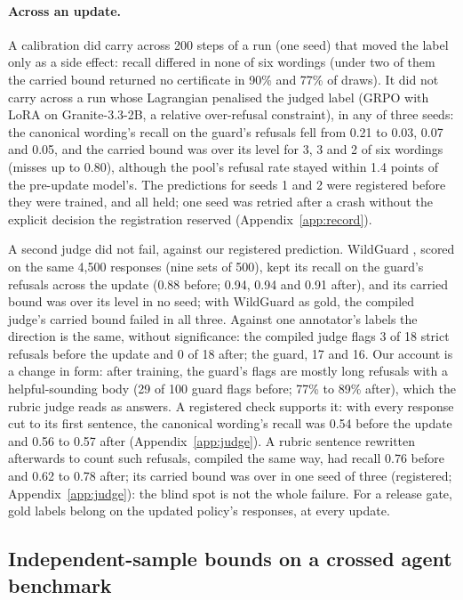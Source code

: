\documentclass[letterpaper]{article} %
\begin{document}
\paragraph{Across an update.} A calibration did carry across 200 steps of a run (one seed) that moved the label
only as a side effect: recall differed in none of six wordings (under two of them the carried bound returned no certificate in 90\%
and 77\% of draws). It did not carry across a run whose Lagrangian penalised the judged
label (GRPO with LoRA on Granite-3.3-2B, a relative over-refusal constraint), in any of three seeds: the canonical
wording's recall on the guard's refusals fell from 0.21 to 0.03, 0.07 and 0.05, and the carried bound was over its level
for 3, 3 and 2 of six wordings (misses up to 0.80), although the pool's refusal rate stayed within 1.4 points of the
pre-update model's. The predictions for seeds 1 and 2 were registered before they were trained, and all held; one seed was retried after a
crash without the explicit decision the registration reserved (Appendix~\ref{app:record}).

A second judge did not fail, against our registered prediction. WildGuard
\citep{han2024wildguard}, scored on the same
4,500 responses (nine sets of 500), kept its recall on the guard's refusals across the update (0.88 before; 0.94, 0.94 and 0.91 after), and
its carried bound was over its level in no seed; with WildGuard as gold, the compiled judge's carried bound failed in all
three. Against one annotator's labels the direction is the same, without significance: the compiled judge flags 3 of 18
strict refusals before the update and 0 of 18 after; the guard, 17 and 16. Our
account is a change in form: after training, the guard's flags are mostly long refusals
with a helpful-sounding body (29 of 100 guard flags before; 77\% to 89\% after), which the
rubric judge reads as answers. A registered check supports it: with every response cut to its first sentence, the
canonical wording's recall was 0.54 before the update and 0.56 to 0.57 after (Appendix~\ref{app:judge}). A rubric sentence rewritten afterwards to count such
refusals, compiled the same way, had recall 0.76 before and 0.62 to 0.78 after; its carried bound was
over in one seed of three (registered; Appendix~\ref{app:judge}): the blind spot is not the whole failure. For a release gate, gold labels belong on the updated policy's responses, at every update.

\subsection{Independent-sample bounds on a crossed agent benchmark}
\end{document}
